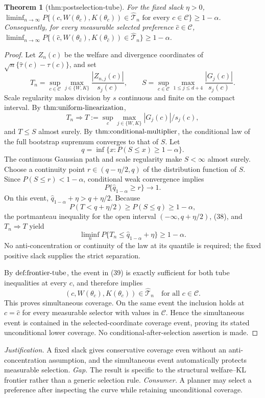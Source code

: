 \documentclass{article}
\newtheorem{theorem}{Theorem}
\begin{document}
\begin{theorem}[thm:postselection-tube]\label{thm:postselection-tube}
For the fixed slack \(\eta>0\), \(\liminf_{n\to\infty}P\{(c,W(\theta_c),K(\theta_c))\in\widehat{\mathcal T}_n\text{ for every }c\in\mathcal C\}\ge1-\alpha\). Consequently, for every measurable selected preference \(\widehat c\in\mathcal C\), \(\liminf_{n\to\infty}P\{(\widehat c,W(\theta_{\widehat c}),K(\theta_{\widehat c}))\in\widehat{\mathcal T}_n\}\ge1-\alpha\).
\end{theorem}
\begin{proof}
Let \(Z_n(c)\) be the welfare and divergence coordinates of \(\sqrt n\{\widehat\tau(c)-\tau(c)\}\), and set
\[
 T_n=\sup_{c\in\mathcal C}\max_{j\in\{W,K\}}\frac{|Z_{n,j}(c)|}{s_j(c)},
 \qquad
 S=\sup_{c\in\mathcal C}\max_{1\leq j\leq d+4}\frac{|G_j(c)|}{s_j(c)}.
\]
Scale regularity makes division by \(s\) continuous and finite on the compact interval. By \(\textnormal{thm:uniform-linearization}\),
\[
 T_n\Rightarrow T:=\sup_c\max_{j\in\{W,K\}}|G_j(c)|/s_j(c),
\]
and \(T\leq S\) almost surely. By \(\textnormal{thm:conditional-multiplier}\), the conditional law of the full bootstrap supremum converges to that of \(S\). Let
\[
 q=\inf\{x:P(S\leq x)\geq1-\alpha\}.
\]
The continuous Gaussian path and scale regularity make \(S<\infty\) almost surely. Choose a continuity point \(r\in(q-\eta/2,q)\) of the distribution function of \(S\). Since \(P(S\leq r)<1-\alpha\), conditional weak convergence implies
\[
 P\{\widehat q_{1-\alpha}\geq r\}\longrightarrow1.
 \tag{38}
\]
On this event, \(\widehat q_{1-\alpha}+\eta>q+\eta/2\). Because
\[
 P(T<q+\eta/2)\geq P(S\leq q)\geq1-\alpha,
\]
the portmanteau inequality for the open interval \(( -\infty,q+\eta/2)\), (38), and \(T_n\Rightarrow T\) yield
\[
 \liminf_nP\{T_n\leq\widehat q_{1-\alpha}+\eta\}\geq1-\alpha.
 \tag{39}
\]
No anti-concentration or continuity of the law at its quantile is required; the fixed positive slack supplies the strict separation.

By \(\textnormal{def:frontier-tube}\), the event in (39) is exactly sufficient for both tube inequalities at every \(c\), and therefore implies
\[
 (c,W(\theta_c),K(\theta_c))\in\widehat{\mathcal T}_n
 \quad\text{for all }c\in\mathcal C.
\]
This proves simultaneous coverage. On the same event the inclusion holds at \(c=\widehat c\) for every measurable selector with values in \(\mathcal C\). Hence the simultaneous event is contained in the selected-coordinate coverage event, proving its stated unconditional lower coverage. No conditional-after-selection assertion is made.
\end{proof}
\par\smallskip\noindent \textit{Justification.} A fixed slack gives conservative coverage even without an anti-concentration assumption, and the simultaneous event automatically protects measurable selection. \textit{Gap.} The result is specific to the structural welfare--KL frontier rather than a generic selection rule. \textit{Consumer.} A planner may select a preference after inspecting the curve while retaining unconditional coverage.
\end{document}
